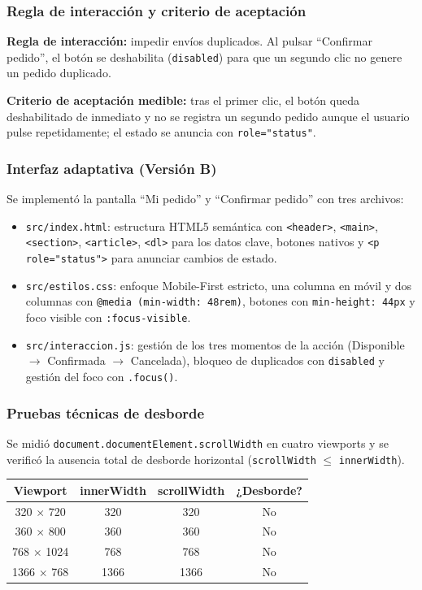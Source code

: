 \documentclass{article}
\begin{document}
\subsubsection{Regla de interacción y criterio de aceptación}
\textbf{Regla de interacción:} impedir envíos duplicados. Al pulsar ``Confirmar pedido'', el botón se deshabilita (\texttt{disabled}) para que un segundo clic no genere un pedido duplicado.

\textbf{Criterio de aceptación medible:} tras el primer clic, el botón queda deshabilitado de inmediato y no se registra un segundo pedido aunque el usuario pulse repetidamente; el estado se anuncia con \texttt{role="status"}.

\subsubsection{Interfaz adaptativa (Versión B)}
Se implementó la pantalla ``Mi pedido'' y ``Confirmar pedido'' con tres archivos:
\begin{itemize}
    \item \texttt{src/index.html}: estructura HTML5 semántica con \texttt{<header>}, \texttt{<main>}, \texttt{<section>}, \texttt{<article>}, \texttt{<dl>} para los datos clave, botones nativos y \texttt{<p role="status">} para anunciar cambios de estado.
    \item \texttt{src/estilos.css}: enfoque Mobile-First estricto, una columna en móvil y dos columnas con \texttt{@media (min-width: 48rem)}, botones con \texttt{min-height: 44px} y foco visible con \texttt{:focus-visible}.
    \item \texttt{src/interaccion.js}: gestión de los tres momentos de la acción (Disponible $\rightarrow$ Confirmada $\rightarrow$ Cancelada), bloqueo de duplicados con \texttt{disabled} y gestión del foco con \texttt{.focus()}.
\end{itemize}

\subsubsection{Pruebas técnicas de desborde}
Se midió \texttt{document.documentElement.scrollWidth} en cuatro viewports y se verificó la ausencia total de desborde horizontal (\texttt{scrollWidth} $\leq$ \texttt{innerWidth}).

\begin{center}
\begin{tabular}{|c|c|c|c|}
\hline
\textbf{Viewport} & \textbf{innerWidth} & \textbf{scrollWidth} & \textbf{¿Desborde?} \\
\hline
320 $\times$ 720 & 320 & 320 & No \\
\hline
360 $\times$ 800 & 360 & 360 & No \\
\hline
768 $\times$ 1024 & 768 & 768 & No \\
\hline
1366 $\times$ 768 & 1366 & 1366 & No \\
\hline
\end{tabular}
\end{center}
\end{document}
